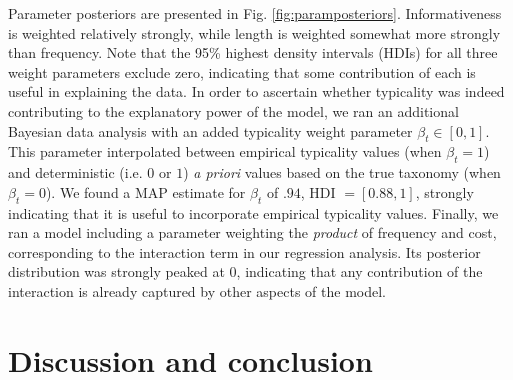 \documentclass[10pt,letterpaper]{article}
\newcommand{\red}[1]{\textcolor{Red}{#1}}
\newcommand{\ndg}[1]{\textcolor{Green}{[ndg: #1]}}
\newcommand{\tableref}[1]{Table \ref{#1}}
\newcommand{\figref}[1]{Fig.~\ref{#1}}
\begin{document}
Parameter posteriors are presented in Fig. \ref{fig:paramposteriors}. 
Informativeness is weighted relatively strongly, while length is weighted somewhat more strongly than frequency.
Note that the 95\% highest density intervals (HDIs) for all three weight parameters exclude zero, indicating that some contribution of each is useful in explaining the data.
In order to ascertain whether typicality was indeed contributing to the explanatory power of the model, we ran an additional Bayesian data analysis with an added typicality weight parameter $\beta_t \in [0,1]$. This parameter interpolated between empirical typicality values (when $\beta_t {=} 1$) and deterministic (i.e. $0$ or $1$) \emph{a priori} values based on the true taxonomy (when $\beta_t {=} 0$).
We found a MAP estimate for $\beta_t$ of $.94$, HDI $= [0.88,1]$, strongly indicating that it is useful to incorporate empirical typicality values.
Finally, we ran a model including a parameter weighting the \emph{product} of frequency and cost, corresponding to the interaction term in our regression analysis. Its posterior distribution was strongly peaked at 0, indicating that any contribution of the interaction is already captured by other aspects of the model. 




\section{\bf Discussion and conclusion}

\end{document}

